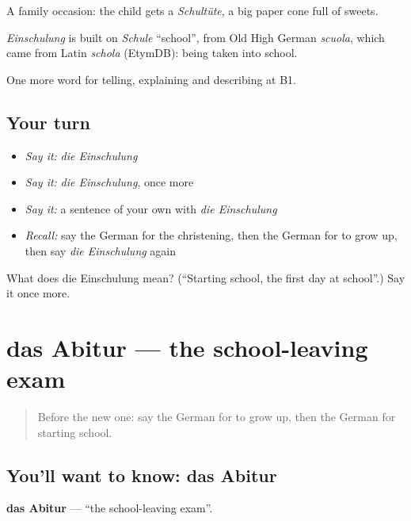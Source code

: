 A family occasion: the child gets a \emph{Schultüte}, a big paper cone full of sweets.

\begin{cousinweb}
\emph{Einschulung} is built on \emph{Schule} \textquotedblleft{}school\textquotedblright{}, from Old High German \emph{scuola}, which came from Latin \emph{schola} (EtymDB): being taken into school.
\end{cousinweb}

\begin{grammarlens}[title={What you've built}]
One more word for telling, explaining and describing at B1.
\end{grammarlens}

\subsection*{Your turn}
\begin{itemize}
\raggedright
  \item \emph{Say it:} \emph{die Einschulung}
  \item \emph{Say it:} \emph{die Einschulung}, once more
  \item \emph{Say it:} a sentence of your own with \emph{die Einschulung}
  \item \emph{Recall:} say the German for the christening, then the German for to grow up, then say \emph{die Einschulung} again
\end{itemize}

\begin{tcolorbox}[breakable,colback=teal!4,colframe=teal!35!black,title={Before you move on}]
What does die Einschulung mean? (\textquotedblleft{}Starting school, the first day at school\textquotedblright{}.) Say it once more.
\end{tcolorbox}
\section[das Abitur]{das Abitur — the school-leaving exam}

\label{lesson:GE-C297-abitur}



\begin{quote}
Before the new one: say the German for to grow up, then the German for starting school.
\end{quote}

\subsection*{You'll want to know: das Abitur}
\textbf{das Abitur} — \textquotedblleft{}the school-leaving exam\textquotedblright{}.


